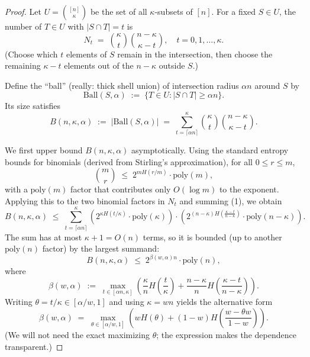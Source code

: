 \documentclass[12pt]{article}
\theoremstyle{definition}
\theoremstyle{definition}
\theoremstyle{remark}
\theoremstyle{remark}
\begin{document}
\begin{proof}
Let $U = \binom{[n]}{\kappa}$ be the set of all $\kappa$-subsets of $[n]$. For a fixed $S \in U$, the number of $T \in U$ with $|S \cap T| = t$ is
\[
N_t \;=\; \binom{\kappa}{t}\binom{n-\kappa}{\kappa-t}, \quad t = 0,1,\ldots,\kappa.
\]
(Choose which $t$ elements of $S$ remain in the intersection, then choose the remaining $\kappa-t$ elements out of the $n-\kappa$ outside $S$.)

Define the ``ball'' (really: thick shell union) of intersection radius $\alpha n$ around $S$ by
\[
\mathrm{Ball}(S,\alpha) \;:=\; \{ T \in U : |S \cap T| \geq \alpha n \}.
\]
Its size satisfies
\begin{equation}
B(n,\kappa,\alpha) \;:=\; |\mathrm{Ball}(S,\alpha)| \;=\; \sum_{t = \lceil \alpha n \rceil}^\kappa \binom{\kappa}{t}\binom{n-\kappa}{\kappa-t}. \tag{1}
\end{equation}

We first upper bound $B(n,\kappa,\alpha)$ asymptotically. Using the standard entropy bounds for binomials (derived from Stirling's approximation), for all $0 \leq r \leq m$,
\[
\binom{m}{r} \;\leq\; 2^{m H(r/m)} \cdot \mathrm{poly}(m),
\]
with a $\mathrm{poly}(m)$ factor that contributes only $O(\log m)$ to the exponent. Applying this to the two binomial factors in $N_t$ and summing (1), we obtain
\[
B(n,\kappa,\alpha) \;\leq\; \sum_{t = \lceil \alpha n \rceil}^\kappa \left( 2^{\kappa H(t/\kappa)} \cdot \mathrm{poly}(\kappa) \right) \cdot \left( 2^{(n-\kappa) H\left(\frac{\kappa-t}{n-\kappa}\right)} \cdot \mathrm{poly}(n-\kappa) \right).
\]
The sum has at most $\kappa+1 = O(n)$ terms, so it is bounded (up to another $\mathrm{poly}(n)$ factor) by the largest summand:
\begin{equation}
B(n,\kappa,\alpha) \;\leq\; 2^{\beta(w,\alpha) n} \cdot \mathrm{poly}(n), \tag{2}
\end{equation}
where
\[
\beta(w,\alpha) \;:=\; \max_{t \in [\alpha n, \kappa]} \left( \frac{\kappa}{n} H\!\left(\frac{t}{\kappa}\right) + \frac{n-\kappa}{n} H\!\left(\frac{\kappa-t}{n-\kappa}\right) \right).
\]
Writing $\theta = t/\kappa \in [\alpha/w, 1]$ and using $\kappa = wn$ yields the alternative form
\[
\beta(w,\alpha) \;=\; \max_{\theta \in [\alpha/w, 1]} \left( w H(\theta) + (1-w) H\!\left(\frac{w - \theta w}{1-w}\right) \right).
\]
(We will not need the exact maximizing $\theta$; the expression makes the dependence transparent.)


\end{proof}
\end{document}
